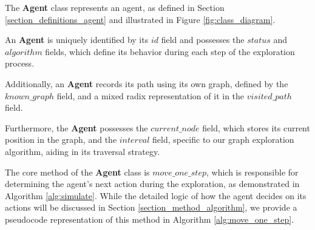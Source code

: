 The \textbf{Agent} class represents an agent, as defined in Section \ref{section_definitions_agent} and illustrated in Figure \ref{fig:class_diagram}.

An \textbf{Agent} is uniquely identified by its $id$ field and possesses the $status$ and $algorithm$ fields,
which define its behavior during each step of the exploration process.

Additionally, an \textbf{Agent} records its path using its own graph, defined by the $known\_graph$ field,
and a mixed radix representation of it in the $visited\_path$ field. 

Furthermore, the \textbf{Agent} possesses the $current\_node$ field, which stores its current position in the graph, and the $interval$ field, specific to our graph exploration algorithm, aiding in its traversal strategy.

The core method of the \textbf{Agent} class is $move\_one\_step$,
which is responsible for determining the agent's next action during the exploration,
as demonstrated in Algorithm \ref{alg:simulate}.
While the detailed logic of how the agent decides on its actions will be discussed in Section \ref{section_method_algorithm},
we provide a pseudocode representation of this method in Algorithm \ref{alg:move_one_step}.


